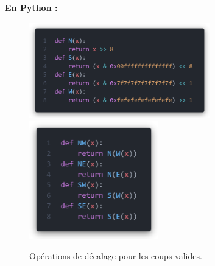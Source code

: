 \noindent \textbf{En Python :}
\begin{figure}[H]
    \centering
    \includegraphics[width=0.7\textwidth]{ressources/operateurCardinaux.png}
    \includegraphics[width=0.5\textwidth]{ressources/operateurCardinauxComposes.png}
    \caption{Opérations de décalage pour les coups valides.}
    \label{fig:shift_ops}
\end{figure}